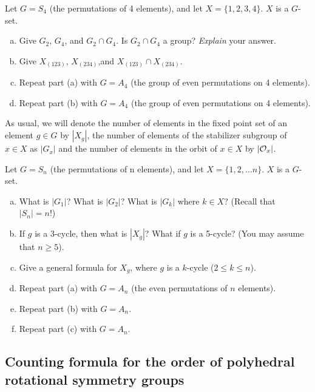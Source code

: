 \begin{exercise}{}
Let $G = S_4$ (the permutations of 4 elements), and let $X = \{1,2,3,4\}$.  $X$ is a $G$-set.
\begin{enumerate}[(a)]
\item
Give $G_2$, $G_4$, and $G_2 \cap G_4$.  Is $G_2 \cap G_4$ a group? \emph{Explain} your answer.
\item
Give $X_{(123)}$, $X_{(234)}$,and  $X_{(123)} \cap X_{(234)}$.
\item
Repeat part (a) with $G=A_4$ (the group of even permutations on 4 elements).
\item
Repeat part (b) with $G=A_4$ (the group of even permutations on 4 elements).
\end{enumerate}
\end{exercise} 
As usual, we will denote the number of elements in the fixed point set of an
element $g \in G$ by $|X_g|$, the number of elements of the stabilizer subgroup of $x\in X$ as $|G_x|$ and the number of elements in the orbit of $x \in X$ by $|{\cal O}_x|$.

\begin{exercise}{}
Let $G = S_n$ (the permutations of n elements), and let $X = \{1,2,\ldots n \}$.  $X$ is a $G$-set.
\begin{enumerate}[(a)]
\item
What is $|G_1|$? What is $|G_2|$? What is $|G_k|$ where $k \in X$?  (Recall that $|S_n| = n!$)
\item
If $g$ is a $3$-cycle, then what is $|X_g|$? What if $g$  is a 5-cycle?  (You may assume that $n \ge 5$).
\item
Give a general formula for $X_g$, where $g$ is a $k$-cycle ($2 \le k \le n$).
\item
Repeat part (a) with $G = A_n$ (the even permutations of $n$ elements).
\item
Repeat part (b) with $G = A_n$.
\item
Repeat part (c) with $G = A_n$.
\end{enumerate}
\end{exercise}


\subsection{Counting formula for the order of  polyhedral rotational symmetry groups}

